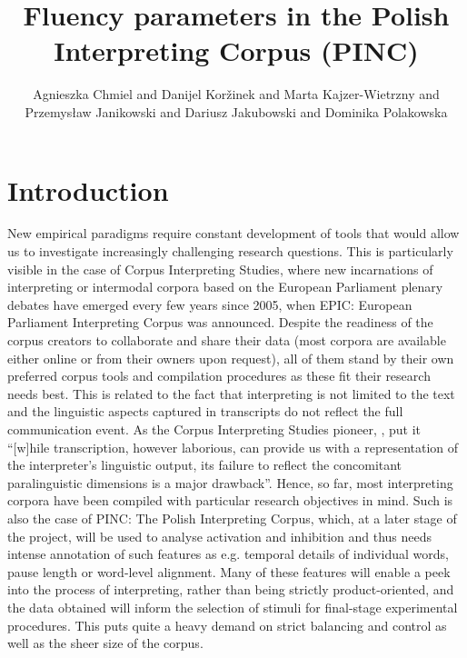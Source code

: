 \documentclass[output=paper]{langscibook}
\author{Agnieszka Chmiel\orcid{}\affiliation{Adam Mickiewicz University} and Danijel Koržinek\orcid{}\affiliation{Polish-Japanese Institute of Information Technology} and Marta Kajzer-Wietrzny\orcid{}\affiliation{Adam Mickiewicz University} and Przemysław Janikowski\orcid{}\affiliation{University of Silesia} and Dariusz Jakubowski\orcid{}\affiliation{University of Silesia} and Dominika Polakowska\orcid{}\affiliation{Adam Mickiewicz University}}
\title{Fluency parameters in the Polish Interpreting Corpus (PINC)}
\begin{document}
\maketitle
 
 
 

 

\section{Introduction}\label{sec:chmiel:1}

New empirical paradigms require constant development of tools that would allow us to investigate increasingly challenging research questions. This is particularly visible in the case of Corpus Interpreting Studies, where new incarnations of interpreting or intermodal corpora based on the European Parliament plenary debates have emerged every few years since 2005, when EPIC: European Parliament Interpreting Corpus \citep{MontiEtAl2005} was announced. Despite the readiness of the corpus creators to collaborate and share their data (most corpora are available either online or from their owners upon request), all of them stand by their own preferred corpus tools and compilation procedures as these fit their research needs best. This is related to the fact that interpreting is not limited to the text and the linguistic aspects captured in transcripts do not reflect the full communication event. As the Corpus Interpreting Studies pioneer, \citet[1]{Shlesinger1998}, put it “[w]hile transcription, however laborious, can provide us with a representation of the interpreter's linguistic output, its failure to reflect the concomitant paralinguistic dimensions is a major drawback”. Hence, so far, most interpreting corpora have been compiled with particular research objectives in mind. Such is also the case of PINC: The Polish Interpreting Corpus, which, at a later stage of the project, will be used to analyse activation and inhibition and thus needs intense annotation of such features as e.g. temporal details of individual words, pause length or word-level alignment. Many of these features will enable a peek into the process of interpreting, rather than being strictly product-oriented, and the data obtained will inform the selection of stimuli for final-stage experimental procedures. This puts quite a heavy demand on strict balancing and control as well as the sheer size of the corpus.
\end{document}
